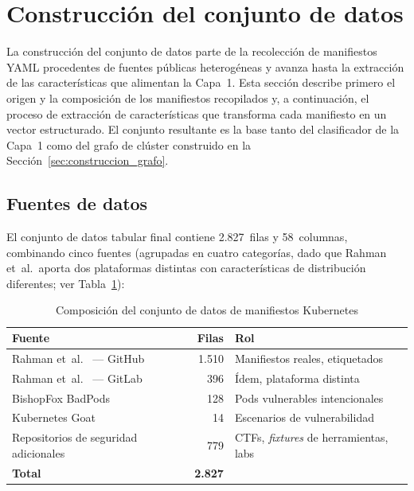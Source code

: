 \section{Construcción del conjunto de datos}
\label{sec:construccion_dataset}

La construcción del conjunto de datos parte de la recolección de manifiestos
\acs{YAML} procedentes de fuentes públicas heterogéneas y avanza hasta la
extracción de las características que alimentan la Capa~1. Esta sección describe
primero el origen y la composición de los manifiestos recopilados y, a
continuación, el proceso de extracción de características que transforma cada
manifiesto en un vector estructurado. El conjunto resultante es la base tanto del
clasificador de la Capa~1 como del grafo de clúster construido en la
Sección~\ref{sec:construccion_grafo}.

\subsection{Fuentes de datos}
\label{sec:fuentes_datos}

El conjunto de datos tabular final contiene 2.827~filas y 58~columnas, combinando
cinco fuentes (agrupadas en cuatro categorías, dado que Rahman et~al.\ aporta dos
plataformas distintas con características de distribución diferentes; ver Tabla~\ref{tab:dataset}):

\begin{table}[htbp]
\centering\small
\caption{Composición del conjunto de datos de manifiestos Kubernetes}
\label{tab:dataset}
\begin{tabular}{@{}p{5.4cm}rp{4.9cm}@{}}
\toprule
Fuente & Filas & Rol \\
\midrule
Rahman et~al.\ \citep{Rahman2022} — GitHub & 1.510 & Manifiestos reales, etiquetados \\
Rahman et~al.\ \citep{Rahman2022} — GitLab & 396 & Ídem, plataforma distinta \\
BishopFox BadPods \citep{BishopFox2021} & 128 & Pods vulnerables intencionales \\
Kubernetes Goat \citep{KubernetesGoat} & 14 & Escenarios de vulnerabilidad \\
Repositorios de seguridad adicionales & 779 & CTFs, \textit{fixtures} de herramientas, labs \\
\midrule
\textbf{Total} & \textbf{2.827} & \\
\bottomrule
\end{tabular}
\fuentepropia
\end{table}

